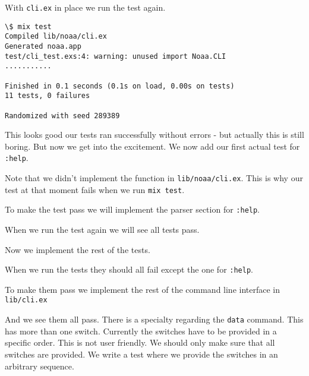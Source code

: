 \documentclass[10pt, a4paper]{article}
\newcommand{\includecode}[3]{}
\begin{document}
\includecode{lib/noaa/cli.ex}{lst:cli}{listings/cli.ex}

With \texttt{cli.ex} in place we run the test again.

\begin{verbatim}
\$ mix test
Compiled lib/noaa/cli.ex
Generated noaa.app
test/cli_test.exs:4: warning: unused import Noaa.CLI
...........

Finished in 0.1 seconds (0.1s on load, 0.00s on tests)
11 tests, 0 failures

Randomized with seed 289389
\end{verbatim}

This looks good our tests ran successfully without errors - but actually this
is still boring. But now we get into the excitement. We now add our first 
actual test for \texttt{:help}.

\includecode{test/cli\_test1.exs}{lst:clitest1}{listings/cli_test1.exs}

Note that we didn't implement the function in \texttt{lib/noaa/cli.ex}. This
is why our test at that moment fails when we run \texttt{mix test}.

\includecode{mix test}{lst:testresult1}{listings/test-result1}

To make the test pass we will implement the parser section for \texttt{:help}.

\includecode{lib/noaa/cli2.ex}{lst:cli2}{listings/cli2.ex}

When we run the test again we will see all tests pass.

\includecode{mix test}{lst:testresult2}{listings/test-result2}

Now we implement the rest of the tests.

\includecode{test/cli2\_test}{lst:clitest}{listings/cli_test2.exs}

When we run the tests they should all fail except the one for \texttt{:help}.

\includecode{mix test}{lst:testresult3}{listings/test-result3}

To make them pass we implement the rest of the command line interface in 
\texttt{lib/cli.ex}

\includecode{lib/cli3.ex}{lst:cli3}{listings/cli3.ex}

And we see them all pass. There is a specialty regarding the \texttt{data}
command. This has more than one switch. Currently the switches have to be 
provided in a specific order. This is not user friendly. We should only make 
sure that all switches are provided. We write a test where we provide the 
switches in an arbitrary sequence.
\end{document}
